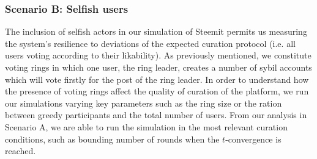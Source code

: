     \subsubsection{Scenario B: Selfish users}
      The inclusion of selfish actors in our simulation of Steemit permits us
      measuring the system's resilience to deviations of the expected curation
      protocol (i.e. all users voting according to their likability). As
      previously mentioned, we constitute voting rings in which one user, the
      ring leader, creates a number of sybil accounts which will vote firstly
      for the post of the ring leader. In order to understand how the presence
      of voting rings affect the quality of curation of the platform, we run our
      simulations varying key parameters such as the ring size or the ration
      between greedy participants and the total number of users. From our
      analysis in Scenario A, we are able to run the simulation in the most
      relevant curation conditions, such as bounding number of rounds when the
      $t$-convergence is reached.

